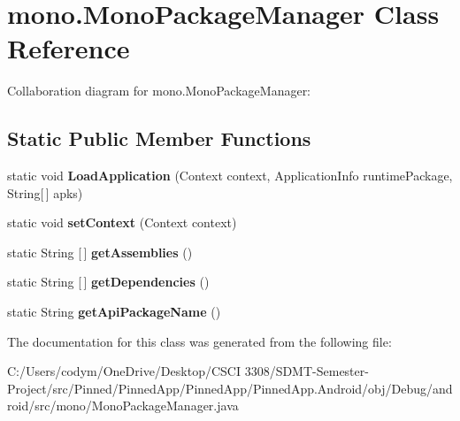 \hypertarget{classmono_1_1_mono_package_manager}{}\section{mono.\+Mono\+Package\+Manager Class Reference}
\label{classmono_1_1_mono_package_manager}


Collaboration diagram for mono.\+Mono\+Package\+Manager\+:
\subsection*{Static Public Member Functions}
\begin{DoxyCompactItemize}
\item 
\mbox{\label{classmono_1_1_mono_package_manager_a5a2d5fc7f4891ab84e6deeae523686a2}} 
static void {\bfseries Load\+Application} (Context context, Application\+Info runtime\+Package, String\mbox{[}$\,$\mbox{]} apks)
\item 
\mbox{\label{classmono_1_1_mono_package_manager_ad3ff1f574349729b27f86da6c25c0f55}} 
static void {\bfseries set\+Context} (Context context)
\item 
\mbox{\label{classmono_1_1_mono_package_manager_a4db80b0afa9fab894e267e09bc3da334}} 
static String \mbox{[}$\,$\mbox{]} {\bfseries get\+Assemblies} ()
\item 
\mbox{\label{classmono_1_1_mono_package_manager_a708931514353feff12f2cc9d99865a9e}} 
static String \mbox{[}$\,$\mbox{]} {\bfseries get\+Dependencies} ()
\item 
\mbox{\label{classmono_1_1_mono_package_manager_a009d16dedf56862f4a23ee05e180e028}} 
static String {\bfseries get\+Api\+Package\+Name} ()
\end{DoxyCompactItemize}


The documentation for this class was generated from the following file\+:\begin{DoxyCompactItemize}
\item 
C\+:/\+Users/codym/\+One\+Drive/\+Desktop/\+C\+S\+C\+I 3308/\+S\+D\+M\+T-\/\+Semester-\/\+Project/src/\+Pinned/\+Pinned\+App/\+Pinned\+App/\+Pinned\+App.\+Android/obj/\+Debug/android/src/mono/Mono\+Package\+Manager.\+java\end{DoxyCompactItemize}
